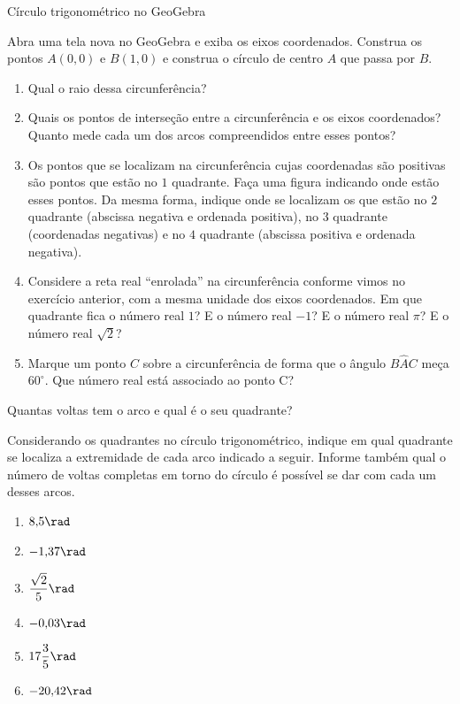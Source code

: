 \begin{task}{Círculo trigonométrico no GeoGebra}
\label{trig-ativ12}

Abra uma tela nova no GeoGebra e exiba os eixos coordenados. Construa os pontos $A(0,0)$ e $B(1,0)$ e construa o círculo de centro $A$ que passa por $B$.
\begin{enumerate}
\item Qual o raio dessa circunferência?
\item Quais os pontos de interseção entre a circunferência e os eixos coordenados? Quanto mede cada um dos arcos compreendidos entre esses pontos?
\item Os pontos que se localizam na circunferência cujas coordenadas são positivas são pontos que estão no $1$ quadrante. Faça uma figura indicando onde estão esses pontos. Da mesma forma, indique onde se localizam os que estão no $2$ quadrante (abscissa negativa e ordenada positiva), no $3$ quadrante (coordenadas negativas) e no $4$ quadrante (abscissa positiva e ordenada negativa).
\clearpage

\item Considere a reta real “enrolada”{} na circunferência conforme vimos no exercício anterior, com a mesma unidade dos eixos coordenados. Em que quadrante fica o número real $1$? E o número real $-1$? E o número real $\pi$? E o número real $\sqrt{2}$?
\item Marque um ponto $C$ sobre a circunferência de forma que o ângulo $B\hat{A}C$ meça $60^{\circ}$. Que número real está associado ao ponto C?
\end{enumerate}
\end{task}

\begin{task}{Quantas voltas tem o arco e qual é o seu quadrante?}
\label{trig-ativ13}

Considerando os quadrantes no círculo trigonométrico, indique em qual quadrante se localiza a extremidade de cada arco indicado a seguir. Informe também qual o número de voltas completas em torno do círculo é possível se dar com cada um desses arcos.

\begin{enumerate}
\item $8{,}5\rad$
\item $-1{,}37\rad$
\item $\dfrac{\sqrt{2}}{5}\rad$
\item $-0{,}03\rad$
\item $17\dfrac{3}{5}\rad$
\item $-20{,}42\rad$
\end{enumerate}
\end{task}

